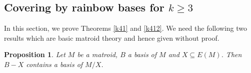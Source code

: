 \documentclass{article}
\newtheorem{Proposition}[Statement]{Proposition}
\newtheorem{Theorem}[Statement]{Theorem}
\newtheorem{Corollary}[Statement]{Corollary}
\begin{document}






\subsection{Covering by rainbow bases for $k\geq 3$}\label{aumoins3}

In this section, we prove Theorems \ref{k41} and \ref{k412}.
We need the following two results which are basic matroid theory and hence given without proof.
\begin{Proposition}\label{trivmat1}
Let $M$ be a matroid, $B$ a basis of $M$ and $X \subseteq E(M)$. Then $B-X$ contains a basis of $M/X$.
\end{Proposition}
\end{document}
